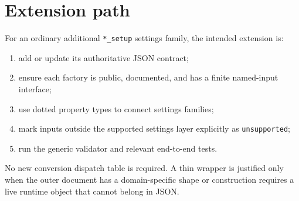 \documentclass[10pt,a4paper]{article}
\newcommand{\code}[1]{\texttt{#1}}
\begin{document}
\section{Extension path}

For an ordinary additional \code{*\_setup} settings family, the intended
extension is:

\begin{enumerate}[leftmargin=7mm,itemsep=1.5mm]
  \item add or update its authoritative JSON contract;
  \item ensure each factory is public, documented, and has a finite named-input
        interface;
  \item use dotted property types to connect settings families;
  \item mark inputs outside the supported settings layer explicitly as
        \code{unsupported};
  \item run the generic validator and relevant end-to-end tests.
\end{enumerate}

No new conversion dispatch table is required. A thin wrapper is justified only
when the outer document has a domain-specific shape or construction requires a
live runtime object that cannot belong in JSON.
\end{document}

